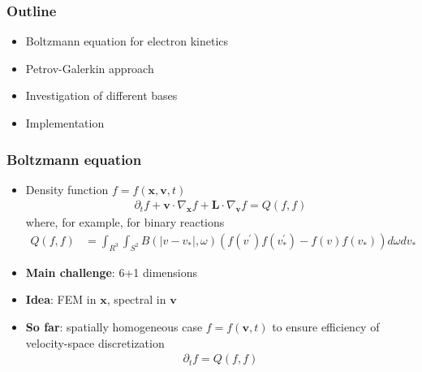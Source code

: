 \documentclass[mathserif, aspectratio=169]{beamer}
\newcommand{\vect}[1]{\boldsymbol{#1}}
\begin{document}
\begin{frame}
\frametitle{Outline}
\begin{itemize}
  \item Boltzmann equation for electron kinetics
  \item Petrov-Galerkin approach
  \item Investigation of different bases
  \item Implementation 
\end{itemize}
\end{frame}

\begin{frame}
\frametitle{Boltzmann equation}
%
\begin{itemize}
\item Density function $f = f(\vect{x}, \vect{v}, t)$
\small
\begin{align*}
\partial_t f + \vect{v}\cdot \nabla_{\vect{x}} f  + \vect{L} \cdot \nabla_{\vect{v }}f = Q(f,f)
\end{align*}
where, for example, for binary reactions
\begin{align*}
Q(f,f) &= \int_{R^3}\int_{S^2} B(|v-v_*|,\omega) 
\left( f(v^\prime)f(v_*^\prime) - f(v)f(v_*) \right) d\omega dv_*
\end{align*}
\item \textbf{Main challenge}: 6+1 dimensions
\item \textbf{Idea}: FEM in $\vect{x}$, spectral in $\vect{v}$
\item \textbf{So far}: spatially homogeneous case $f = f(\vect{v}, t)$ to ensure efficiency of velocity-space discretization
\begin{align*}
\partial_t f = Q(f,f)
\end{align*}
\end{itemize}
%
\end{frame}
\end{document}
